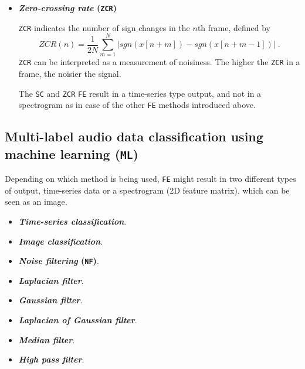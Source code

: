 \documentclass[12pt]{report}
\begin{document}
\begin{itemize}
		\item \textbf{\textit{Zero-crossing rate} ({\tt ZCR})}
		\par {\tt ZCR} indicates the number of sign changes in the $n$th frame, defined by
		\begin{equation}\label{eq:6}
			ZCR(n) = \frac{1}{2N} \sum_{m = 1}^{N} |sgn(x[n + m]) - sgn(x[n + m - 1])| \; .
		\end{equation}
		{\tt ZCR} can be interpreted as a measurement of noisiness. The higher the {\tt ZCR} in a frame, the noisier the signal.
		\par The {\tt SC} and {\tt ZCR} {\tt FE} result in a time-series type output, and not in a spectrogram as in case of the other {\tt FE} methods introduced above.
	\end{itemize}
	
	\subsection{Multi-label audio data classification using machine learning ({\tt ML})}
	
	Depending on which method is being used, {\tt FE} might result in two different types of output, time-series data or a spectrogram (2D feature matrix), which can be seen as an image.
	
	\begin{itemize}
		\item \textbf{\textit{Time-series classification}}.
		
		\item \textbf{\textit{Image classification}}.
		
		\item \textbf{\textit{Noise filtering} ({\tt NF})}.
		
		\item \textbf{\textit{Laplacian filter}}.
		
		\item \textbf{\textit{Gaussian filter}}.
		
		\item \textbf{\textit{Laplacian of Gaussian filter}}.
		
		\item \textbf{\textit{Median filter}}.
		
		\item \textbf{\textit{High pass filter}}.
	\end{itemize}
	
	
\end{document}
